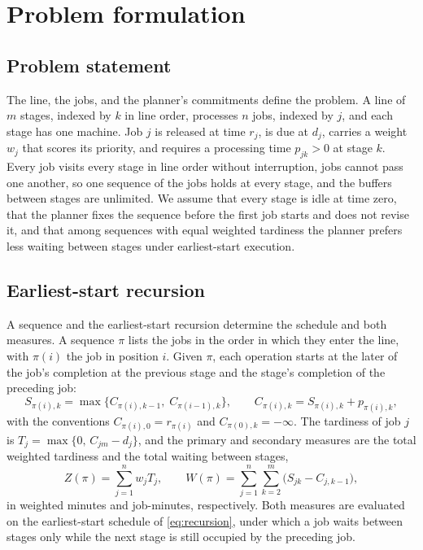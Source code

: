 \section{Problem formulation}\label{sec:problem}

\subsection{Problem statement}\label{sec:setting}

\sumpara The line, the jobs, and the planner's commitments define the problem. \sumparaend
\fin A line of $m$ stages, indexed by $k$ in line order, processes $n$ jobs, indexed by $j$, and each stage has one machine. \fine
\fin Job $j$ is released at time $r_j$, is due at $d_j$, carries a weight $w_j$ that scores its priority, and requires a processing time $p_{jk} > 0$ at stage $k$. \fine
\fin Every job visits every stage in line order without interruption, jobs cannot pass one another, so one sequence of the jobs holds at every stage, and the buffers between stages are unlimited. \fine
\fin We assume that every stage is idle at time zero, that the planner fixes the sequence before the first job starts and does not revise it, and that among sequences with equal weighted tardiness the planner prefers less waiting between stages under earliest-start execution. \fine

\subsection{Earliest-start recursion}\label{sec:timing}

\sumpara A sequence and the earliest-start recursion determine the schedule and both measures. \sumparaend
\fin A sequence $\pi$ lists the jobs in the order in which they enter the line, with $\pi(i)$ the job in position $i$. \fine
\fin Given $\pi$, each operation starts at the later of the job's completion at the previous stage and the stage's completion of the preceding job: \fine
\begin{equation}\label{eq:recursion}
S_{\pi(i),k} = \max\bigl\{C_{\pi(i),k-1},\; C_{\pi(i-1),k}\bigr\}, \qquad C_{\pi(i),k} = S_{\pi(i),k} + p_{\pi(i),k},
\end{equation}
\fin with the conventions $C_{\pi(i),0} = r_{\pi(i)}$ and $C_{\pi(0),k} = -\infty$. \fine
\fin The tardiness of job $j$ is $T_j = \max\{0,\, C_{jm} - d_j\}$, and the primary and secondary measures are the total weighted tardiness and the total waiting between stages, \fine
\begin{equation}\label{eq:measures}
Z(\pi) = \sum_{j=1}^{n} w_j T_j, \qquad W(\pi) = \sum_{j=1}^{n} \sum_{k=2}^{m} \bigl(S_{jk} - C_{j,k-1}\bigr),
\end{equation}
\fin in weighted minutes and job-minutes, respectively. \fine
\fin Both measures are evaluated on the earliest-start schedule of \eqref{eq:recursion}, under which a job waits between stages only while the next stage is still occupied by the preceding job. \fine

